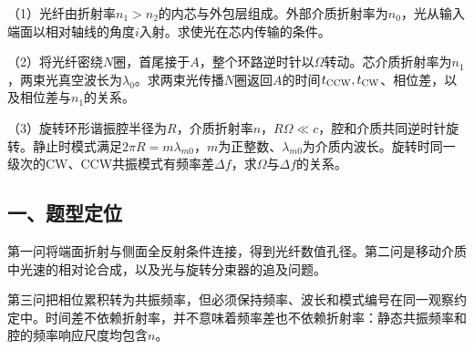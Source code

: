 \documentclass[12pt,a4paper,fontset=fandol]{ctexart}
\begin{document}
（1）光纤由折射率\(n_1>n_2\)的内芯与外包层组成。外部介质折射率为\(n_0\)，光从输入端面以相对轴线的角度\(i\)入射。求使光在芯内传输的条件。

\begin{center}
\begin{minipage}{\linewidth}
\centering\begingroup{}
\ifdim\wd\diagrambox>.88\linewidth
\sbox{\diagrambox}{\resizebox{.88\linewidth}{!}{\usebox{\diagrambox}}}\fi
\ifdim\ht\diagrambox>.38\textheight
\resizebox{!}{.38\textheight}{\usebox{\diagrambox}}
\else\usebox{\diagrambox}\fi
\par{}\endgroup\end{minipage}\end{center}

（2）将光纤密绕\(N\)圈，首尾接于\(A\)，整个环路逆时针以\(\Omega\)转动。芯介质折射率为\(n_1\)，两束光真空波长为\(\lambda_0\)。求两束光传播\(N\)圈返回\(A\)的时间\(t_{\rm CCW},t_{\rm CW}\)、相位差，以及相位差与\(n_1\)的关系。

（3）旋转环形谐振腔半径为\(R\)，介质折射率\(n\)，\(R\Omega\ll c\)，腔和介质共同逆时针旋转。静止时模式满足\(2\pi R=m\lambda_{m0}\)，\(m\)为正整数、\(\lambda_{m0}\)为介质内波长。旋转时同一级次的CW、CCW共振模式有频率差\(\Delta f\)，求\(\Omega\)与\(\Delta f\)的关系。

\subsection{一、题型定位}\label{ux4e00ux9898ux578bux5b9aux4f4d-5}

第一问将端面折射与侧面全反射条件连接，得到光纤数值孔径。第二问是移动介质中光速的相对论合成，以及光与旋转分束器的追及问题。

第三问把相位累积转为共振频率，但必须保持频率、波长和模式编号在同一观察约定中。时间差不依赖折射率，并不意味着频率差也不依赖折射率：静态共振频率和腔的频率响应尺度均包含\(n\)。
\end{document}
